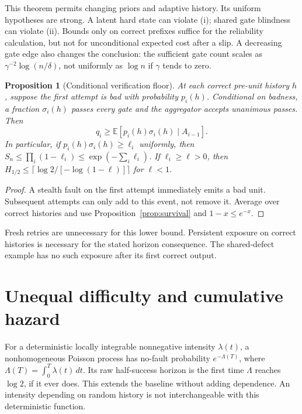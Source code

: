 \documentclass[11pt]{article}
\newtheorem{proposition}[theorem]{Proposition}
\theoremstyle{definition}
\theoremstyle{remark}
\newcommand{\E}{\mathbb E}
\begin{document}
This theorem permits changing priors and adaptive history. Its uniform hypotheses are strong.
A latent hard state can violate (i); shared gate blindness can violate (ii). Bounds only on
correct prefixes suffice for the reliability calculation, but not for unconditional expected
cost after a slip. A decreasing gate edge also changes the conclusion: the sufficient gate count
scales as $\gamma^{-2}\log(n/\delta)$, not uniformly as $\log n$ if $\gamma$ tends to zero.

\begin{proposition}[Conditional verification floor]\label{prop:floor}
At each correct pre-unit history $h$, suppose the first attempt is bad with probability $p_i(h)$.
Conditional on badness, a fraction $\sigma_i(h)$ passes every gate and the aggregator accepts
unanimous passes. Then
\[
q_i\ge \E[p_i(h)\sigma_i(h)\mid A_{i-1}].
\]
In particular, if $p_i(h)\sigma_i(h)\ge\ell_i$ uniformly, then
$S_n\le\prod_i(1-\ell_i)\le\exp(-\sum_i\ell_i)$.
If $\ell_i\ge\ell>0$, then
$H_{1/2}\le\lceil\log 2/[-\log(1-\ell)]\rceil$ for $\ell<1$.
\end{proposition}
\begin{proof}
A stealth fault on the first attempt immediately emits a bad unit. Subsequent attempts can
only add to this event, not remove it. Average over correct histories and use
Proposition~\ref{prop:survival} and $1-x\le e^{-x}$.
\end{proof}
Fresh retries are unnecessary for this lower bound. Persistent exposure on correct histories
is necessary for the stated horizon consequence. The shared-defect example has no such
exposure after its first correct output.

\section{Unequal difficulty and cumulative hazard}\label{sec:hazard}
For a deterministic locally integrable nonnegative intensity $\lambda(t)$, a nonhomogeneous
Poisson process has no-fault probability $e^{-\Lambda(T)}$, where
$\Lambda(T)=\int_0^T\lambda(t)\,dt$. Its raw half-success horizon is the first time
$\Lambda$ reaches $\log2$, if it ever does. This extends the baseline without adding dependence.
An intensity depending on random history is not interchangeable with this deterministic function.
\end{document}
